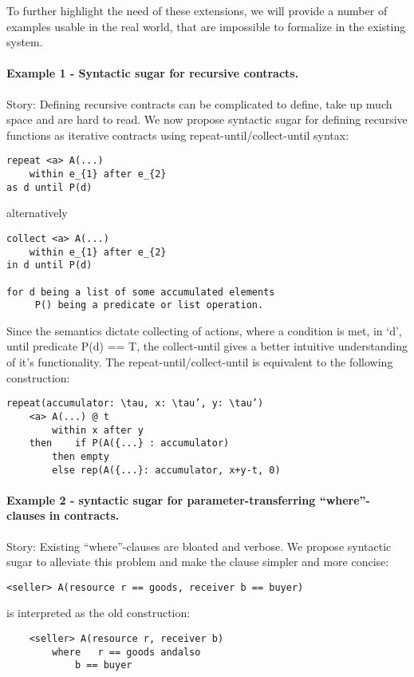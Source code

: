 \documentclass[a4paper,oneside, final, twocolumn]{memoir}
\begin{document}
To further highlight the need of these extensions, we will provide a number of
examples usable in the real world, that are impossible to formalize in the
existing system.

\paragraph{Example 1 - Syntactic sugar for recursive contracts.}
Story: Defining recursive contracts can be complicated to define, take up much
space and are hard to read. We now propose syntactic sugar for defining
recursive functions as iterative contracts using repeat-until/collect-until
syntax:

\begin{verbatim}
repeat <a> A(...)
	within e_{1} after e_{2}
as d until P(d)
\end{verbatim}
alternatively
\begin{verbatim}
collect <a> A(...)
	within e_{1} after e_{2}
in d until P(d)

for d being a list of some accumulated elements
     P() being a predicate or list operation.
\end{verbatim}     
Since the semantics dictate collecting of actions, where a condition is met, in
‘d’, until predicate P(d) == T, the collect-until gives a better intuitive
understanding of it’s functionality.
The repeat-until/collect-until is equivalent to the following construction:
\begin{verbatim}
repeat(accumulator: \tau, x: \tau’, y: \tau’)
	<a> A(...) @ t
		within x after y
	then 	if P(A({...} : accumulator)
		then empty
		else rep(A({...}: accumulator, x+y-t, 0)
\end{verbatim}

\paragraph{Example 2 - syntactic sugar for parameter-transferring “where”-clauses in contracts.}
Story: Existing “where”-clauses are bloated and verbose. We propose syntactic sugar to alleviate this problem and make the clause simpler and more concise:

\begin{verbatim}
<seller> A(resource r == goods, receiver b == buyer)
\end{verbatim}
is interpreted as the old construction:
\begin{verbatim}
	<seller> A(resource r, receiver b)
		where 	r == goods andalso
			b == buyer
\end{verbatim}
\end{document}
